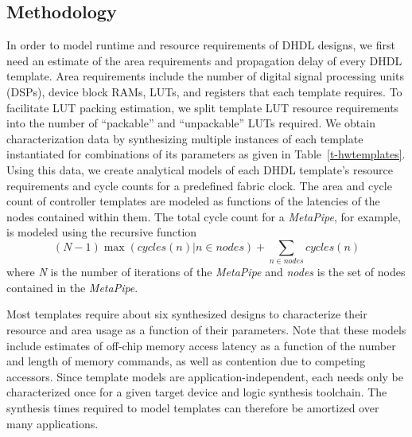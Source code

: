 \subsection{Methodology}
In order to model runtime and resource requirements of DHDL designs, we first need an estimate of the area requirements and
propagation delay of every DHDL template. Area requirements include the number of digital signal processing
units (DSPs), device block RAMs, LUTs, and registers that each template requires. To facilitate LUT packing estimation,
we split template LUT resource requirements into the number of ``packable'' and ``unpackable'' LUTs required.
We obtain characterization data by synthesizing multiple instances of each template instantiated for combinations of its parameters as given in Table~\ref{t-hwtemplates}.
Using this data, we create analytical models of each DHDL template's resource requirements and cycle counts for
a predefined fabric clock. The area and cycle count of controller templates are modeled as functions of the latencies of the nodes contained within them.
The total cycle count for a \emph{MetaPipe}, for example, is modeled using the recursive function
\begin{displaymath}
(N-1)\max(cycles(n) | n \in nodes) + \sum_{n \in nodes} cycles(n)
\end{displaymath}
where \emph{N} is the number of iterations of the \emph{MetaPipe} and \emph{nodes} is the set of nodes contained in the \emph{MetaPipe}.

Most templates require about six synthesized designs to characterize their resource and area usage as a function of their parameters. Note that these models include estimates of off-chip memory access latency as a function of the
number and length of memory commands, as well as contention due to competing accessors. Since template models are application-independent, each needs only be characterized once for a given target device and logic synthesis toolchain. The synthesis times required to model templates can therefore be amortized over many applications.

